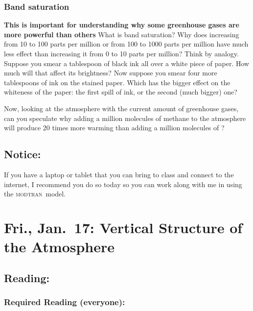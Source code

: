 \documentclass[
]{article}
\newcommand{\COO}{\ce{CO2}}
\newcommand{\MODTRAN}{\textsc{modtran}}
\begin{document}
\hypertarget{band-saturation}{%
\subsubsection{Band saturation}\label{band-saturation}}

\textbf{This is important for understanding why some greenhouse gases
are more powerful than others} What is band saturation? Why does
increasing \COO{} from 10 to 100 parts per million or from 100 to 1000
parts per million have much less effect than increasing it from 0 to 10
parts per million? Think by analogy. Suppose you smear a tablespoon of
black ink all over a white piece of paper. How much will that affect its
brightness? Now suppose you smear four more tablespoons of ink on the
stained paper. Which has the bigger effect on the whiteness of the
paper: the first spill of ink, or the second (much bigger) one?

Now, looking at the atmosphere with the current amount of greenhouse
gases, can you speculate why adding a million molecules of methane to
the atmosphere will produce 20 times more warming than adding a million
molecules of \COO{}?

\hypertarget{notice-1}{%
\subsection{Notice:}\label{notice-1}}

If you have a laptop or tablet that you can bring to class and connect
to the internet, I recommend you do so today so you can work along with
me in using the \MODTRAN~model.

\hypertarget{fri.-jan.-17-vertical-structure-of-the-atmosphere}{%
\section{Fri., Jan.~17: Vertical Structure of the
Atmosphere}\label{fri.-jan.-17-vertical-structure-of-the-atmosphere}}

\hypertarget{reading-5}{%
\subsection{Reading:}\label{reading-5}}

\hypertarget{required-reading-everyone-4}{%
\subsubsection{Required Reading
(everyone):}\label{required-reading-everyone-4}}
\end{document}
